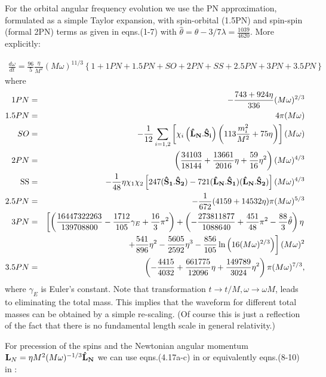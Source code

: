 \documentclass[11pt]{report}
\def\bea{\begin{eqnarray}}
\def\ena{\end{eqnarray}}
\def\bSo{{\bf \hat{S}_1}}
\def\bSt{{\bf \hat{S}_2}}
\def\bL{{\bf \hat{L}_{N}}}
\begin{document}
For the orbital angular frequency evolution we use 
the PN approximation, formulated as a simple Taylor expansion, 
with spin-orbital (1.5PN) and
spin-spin (formal 2PN) terms as given in \cite{BCPV}
eqns.(1-7) with $\hat{\theta} = \theta -3/7\lambda = 
\frac{1039}{4620}$.  More explicitly:

\bea
\frac{d\omega}{dt} = \frac{96}{5}\frac{\eta}{M^2}(M\omega)^{11/3}
\left\{ 1 + 1PN + 1.5PN + SO + 2PN + SS + 2.5PN + 3PN + 3.5PN\right\}
\label{domdt}
\ena
where
\bea
1PN &=& -\frac{743 + 924\eta}{336}(M\omega)^{2/3} \\
1.5PN &=& 4\pi (M\omega) \\
SO &=& -\frac1{12}\sum_{i=1,2}\left[ 
\chi_i\left(\bL.{\bf \hat{S}_i}\right)\left(113\frac{m_i^2}{M^2} + 75\eta\right)
\right](M\omega)\\
2PN &=& \left( \frac{34103}{18144} +\frac{13661}{2016}\eta +\frac{59}{16}\eta^2
\right) (M\omega)^{4/3}\\
\SS &=& -\frac1{48}\eta\chi_1\chi_2\left[ 247(\bSo.\bSt) - 721(\bL.\bSo)(\bL.\bSt)
\right](M\omega)^{4/3}\\
2.5PN &=& -\frac1{672}(4159 + 14532\eta)\pi (M\omega)^{5/3}\\
3PN &=& \left[ \left( \frac{16 447 322 263}{139 708 800} - \frac{1 712}{105}
\gamma_{E} + \frac{16}{3}\pi^2\right) + \left( -\frac{273 811 877}{1 088 640}
+ \frac{451}{48}\pi^2 -\frac{88}{3}\hat{\theta} \right)\eta\right.\nonumber\\
& & \left. + \frac{541}{896}\eta^2 - \frac{5 605}{2 592}\eta^3 - \frac{856}{105}
\ln\left(16(M\omega)^{2/3}\right)\right](M\omega)^{2}\\
3.5PN &=& \left( -\frac{4415}{4032} + \frac{661 775}{12096}\eta + 
\frac{149 789}{3 024}\eta^2\right)\pi (M\omega)^{7/3},
\ena
where $\gamma_{E}$ is Euler's constant. 
Note that transformation $t\to t/M, \omega \to \omega M$,
leads to eliminating the total mass. This implies that the waveform
for different total masses can be obtained by a simple re-scaling.
(Of course this is just a reflection of the fact that there is no
fundamental length scale in general relativity.)

For precession of the spins and the Newtonian angular momentum 
${\bf L}_N = \eta M^2(M\omega)^{-1/3}\bL$
we can use eqns.(4.17a-c) in \cite{Kidder} or equivalently
eqns.(8-10) in \cite{BCPV}:
\end{document}
